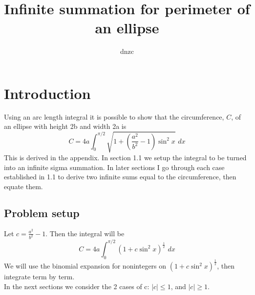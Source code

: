 \documentclass{article}
\begin{document}
\title{Infinite summation for perimeter of an ellipse}
\author{dnzc}
\date{}

\maketitle

\tableofcontents
\newpage



\section{Introduction}
Using an arc length integral it is possible to show that the circumference, $C$, of an ellipse with height 2b and width 2a is
\[C = 4a\int_{0}^{\pi/2}\sqrt{1 + (\frac{a^2}{b^2}-1)\sin^2x}\,\,dx\]
This is derived in the appendix. 
In section 1.1 we setup the integral to be turned into an infinite sigma summation. 
In later sections I go through each case established in 1.1 to derive two infinite sums equal to the circumference, then equate them.
\subsection{Problem setup}
Let $c = \frac{a^2}{b^2}-1$. Then the integral will be
\[C = 4a\int_{0}^{\pi/2}(1 + c\sin^2x)^\frac{1}{2}\,\,dx\]
We will use the binomial expansion for nonintegers on $(1 + c\sin^2x)^\frac{1}{2}$, then integrate term by term.\\
In the next sections we consider the 2 cases of c: $|c| \leq 1$, and $|c| \geq 1$.
\end{document}
